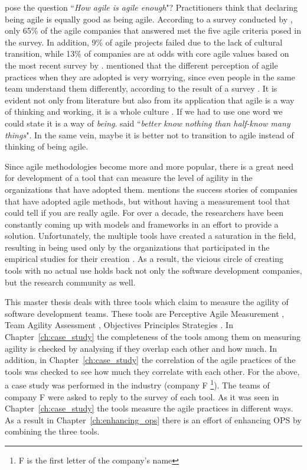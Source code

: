 \citet{comparative_agility} pose the question ``\textit{How agile is agile enough}"? Practitioners think that declaring being agile is equally good as being agile. According to a survey conducted by \citet{ambysoft}, only 65\% of the agile companies that answered met the five agile criteria posed in the survey. In addition, 9\% of agile projects failed due to the lack of cultural transition, while 13\% of companies are at odds with core agile values based on the most recent survey by \citet{versionOne}. \citet{poonacha} mentioned that the different perception of agile practices when they are adopted is very worrying, since even people in the same team understand them differently, according to the result of a survey \cite{ambler}. It is evident not only from literature but also from its application that agile is a way of thinking and working, it is a whole culture \cite{poonacha}. If we had to use one word we could state it is a way of \textit{being}. \citet{Nietzsche} said ``\textit{better know nothing than half-know many things}". In the same vein, maybe it is better not to transition to agile instead of thinking of being agile. 

Since agile methodologies become more and more popular, there is a great need for development of a tool that can measure the level of agility in the organizations that have adopted them. \citet{sidky} mentions the success stories of companies that have adopted agile methods, but without having a measurement tool that could tell if you are really agile. For over a decade, the researchers have been constantly coming up with models and frameworks in an effort to provide a solution. Unfortunately, the multiple tools have created a saturation in the field, resulting in being used only by the organizations that participated in the empirical studies for their creation \cite{samireh_jalali_dissertation}\cite{Jalali2014}. As a result, the vicious circle of creating tools with no actual use holds back not only the software development companies, but the research community as well.

This master thesis deals with three tools which claim to measure the agility of software development teams. These tools are Perceptive Agile Measurement \cite{pam}, Team Agility Assessment \cite{Leffingwell}, Objectives Principles Strategies \cite{sventha_dissertation}. In Chapter~\ref{ch:case_study} the completeness of the tools among them on measuring agility is checked by analysing if they overlap each other and how much. In addition, in Chapter~\ref{ch:case_study} the correlation of the agile practices of the tools was checked to see how much they correlate with each other. For the above, a case study was performed in the industry (company F \footnote{F is the first letter of the company's name}). The teams of company F were asked to reply to the survey of each tool. As it was seen in Chapter~\ref{ch:case_study} the tools measure the agile practices in different ways. As a result in Chapter~\ref{ch:enhancing_ops} there is an effort of enhancing \ac{OPS} by combining the three tools.

